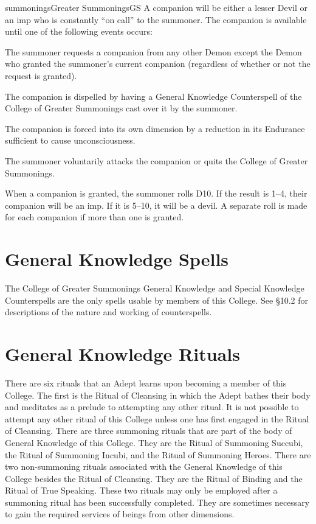 \begin{College}[1.0]{summonings}{Greater Summonings}{GS}
A companion will be either a lesser Devil or an imp who is constantly
“on call” to the summoner.  The companion is available until one of
the following events occurs:

\begin{Enumerate}
\item The summoner requests a companion from any other Demon except
  the Demon who granted the summoner’s current companion (regardless
  of whether or not the request is granted).
\item The companion is dispelled by having a General Knowledge
  Counterspell of the College of Greater Summonings cast over it by
  the summoner.
\item The companion is forced into its own dimension by a reduction in
  its Endurance sufficient to cause unconsciousness.
\item The summoner voluntarily attacks the companion or quits the
  College of Greater Summonings.
\end{Enumerate}

When a companion is granted, the summoner rolls D10.  If the result is
1--4, their companion will be an imp. If it is 5--10, it will be a
devil. A separate roll is made for each companion if more than one is
granted.

\section{General Knowledge Spells}

The College of Greater Summonings General Knowledge and Special
Knowledge Counterspells are the only spells usable by members of this
College.  See §10.2 for descriptions of the nature and working of
counterspells.

\section{General Knowledge Rituals}

There are six rituals that an Adept learns upon becoming a member of
this College. The first is the Ritual of Cleansing in which the Adept
bathes their body and meditates as a prelude to attempting any other
ritual.  It is not possible to attempt any other ritual of this
College unless one has first engaged in the Ritual of Cleansing.
There are three summoning rituals that are part of the body of General
Knowledge of this College. They are the Ritual of Summoning Succubi,
the Ritual of Summoning Incubi, and the Ritual of Summoning Heroes.
There are two non-summoning rituals associated with the General
Knowledge of this College besides the Ritual of Cleansing.  They are
the Ritual of Binding and the Ritual of True Speaking. These two
rituals may only be employed after a summoning ritual has been
successfully completed.  They are sometimes necessary to gain the
required services of beings from other dimensions.


\end{College}
